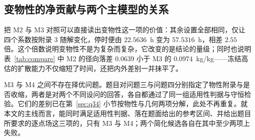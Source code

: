 \subsection{变物性的净贡献与两个主模型的关系}

把 M2 与 M3 对照可以直接读出变物性这一项的价值：其余设置全部相同，仅让四个系数按附录 3 随解变化，停时便由 $22.5636$~h 变为 $57.5316$~h，相差 $2.55$ 倍。这个倍数说明变物性不是为复杂而复杂，它改变的是结论的量级；同时也说明表~\ref{tab:compare} 中 M2 的径向落差 $0.0639$ 小于 M3 的 $0.0974$~kg/kg——冻结高估的扩散能力不仅缩短了时间，还把内外差别一并抹平了。

M3 与 M4 之间不存在择优问题。题目对问题三与问题四分别指定了物性附录与是否收缩，两者是对两个不同设问的回答，各自都通过了同一组适用性判据与守恒检验。它们的差别已在第~\ref{sec:q34} 小节按物性与几何两项分解，此处不再重复。就本文的主线而言，能同时满足适用性判据、落在题面给出的参考区间、并给出题目所要求的逐点场这三项的，只有 M3 与 M4；两个简化候选各自在其中至少两项上失败。
